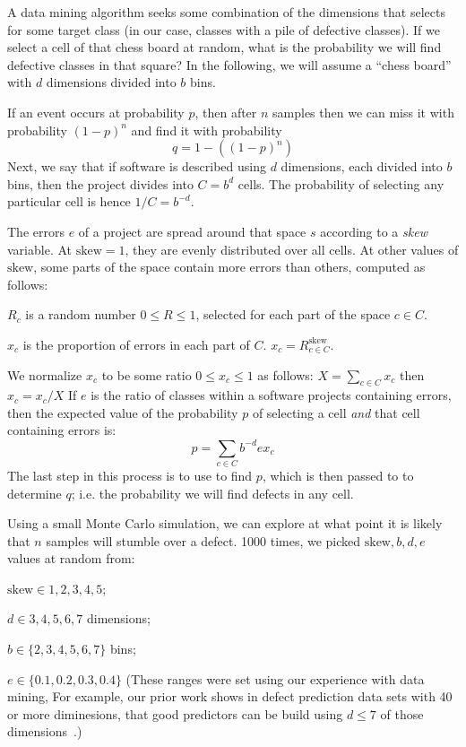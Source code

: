     A data mining algorithm seeks some combination of the dimensions that selects for some target class (in our case,
    classes with a pile of defective classes). If we select a cell of that chess board at random, what is the probability
    we will find defective classes in that square? In the following, we will assume a ``chess board'' with $d$ dimensions
    divided into $b$ bins.

    If an event occurs at probability $p$,
    then after $n$ samples then 
    we can miss it with probability $(1-p)^n$ and find it with probability
    \begin{equation}\label{eq:pb}
      q=1-((1-p)^n)
    \end{equation}
    Next, we say that if software is described using   $d$ dimensions, each divided into $b$ bins, then the 
    project divides into   $C=b^d$ cells.
    The probability of selecting any particular cell is hence $1/C = b^{-d}$.
    
    The  errors $e$ of a project are spread around that space $s$ according to a {\em skew} variable. At $\textrm{skew}=1$, they are evenly distributed over all cells.
    At other values of $\textrm{skew}$, some parts of the space contain more errors than others, computed as follows:
    \bi
  \item $R_c$ is a random number $0\le R \le 1$, selected for each part of the space $c\in C$.
  \item $x_c$ is the proportion of errors in each part of $C$. \mbox{$x_c =  R_{c\in C}^\textrm{skew}$}.
  \item We normalize $x_c$ to be some ratio $0 \le x_c \le 1$ as follows: $X= \sum_{c\in C} x_c$ then $x_c = x_c/X$
    \ei
    If  $e$ is the ratio of classes within a software projects containing errors, then 
    the expected value of the probability $p$ of selecting a cell {\em and} that cell containing errors is:
    \begin{equation}\label{eq:p}
      p = \sum_{c\in C}b^{-d}ex_c
    \end{equation}
    The last step in this process is to use  to find $p$, which is then passed to  to determine $q$;
    i.e. the probability we
    will find defects in any cell.

    Using a small Monte Carlo simulation, we can explore at what point it is likely that $n$ samples will stumble over a defect. 
    1000 times, we picked $\textrm{skew},b,d,e$ values at random from:
    \bi
      \item $\textrm{skew} \in {1,2,3,4,5}$;
  \item $d \in {3,4,5,6,7}$ dimensions;
  \item $b \in \{2,3,4,5,6,7\}$ bins; 
    \item $e\in \{0.1,0.2,0.3,0.4\}$
      \ei
      (These ranges were set using our experience with data mining, For example, our prior work shows in defect prediction data sets
      with 40 or more diminesions, that good predictors can be build using $d\le 7$ of those dimensions~\cite{me07a}.)
      
